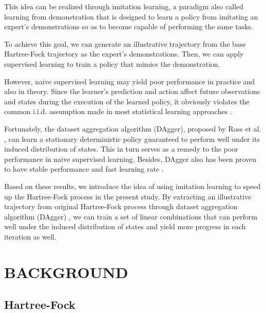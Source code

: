\documentclass[twoside,11pt]{article}
\begin{document}
This idea can be realized through imitation learning, a paradigm also called learning from demonstration that is designed to learn a policy from imitating an expert's demonstrations so as to become capable of performing the same tasks. 

To achieve this goal, we can generate an illustrative trajectory from the base Hartree-Fock trajectory as the expert's demonstrations. Then, we can apply supervised learning to train a policy that mimics the demonstration. 

However, naive supervised learning may yield poor performance in practice and also in theory.  Since the learner's prediction and action affect future observations and states during the execution of the learned policy, it obviously violates the common i.i.d. assumption made in most statistical learning approaches \citep{Ross}.



Fortunately, the dataset aggregation algorithm (DAgger), proposed by Ross et al. \citep{DAgger}, can learn a stationary deterministic policy guaranteed to perform well under its induced distribution of states. This in turn serves as a remedy to the poor performance in naive supervised learning. Besides, DAgger also has been proven to have stable performance and fast learning rate \citep{DAggerCompare}.

Based on these results, we introduce the idea of using imitation learning to speed up the Hartree-Fock process in the present study. By extracting an illustrative trajectory from original Hartree-Fock process
through dataset aggregation algorithm (DAgger) \citep{DAgger}, we can train a set of linear combinations that can perform well under the induced distribution of states and yield more progress in each iteration as well. 


\section{BACKGROUND}

\subsection{Hartree-Fock}


\end{document}
